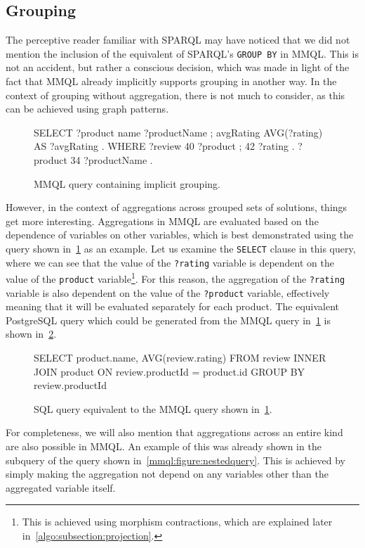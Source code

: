 \subsection{Grouping}
\label{mmql:subsection:grouping}

The perceptive reader familiar with SPARQL may have noticed that we did not mention the inclusion of the equivalent of SPARQL's \texttt{GROUP BY} in MMQL.
This is not an accident, but rather a conscious decision, which was made in light of the fact that MMQL already implicitly supports grouping in another way.
In the context of grouping without aggregation, there is not much to consider, as this can be achieved using graph patterns.

\begin{figure}[ht]
\begin{code}
SELECT {
    ?product name ?productName ;
        avgRating AVG(?rating) AS ?avgRating .
}
WHERE {
    ?review 40 ?product ;
        42 ?rating .
    ?product 34 ?productName .
}
\end{code}
\caption{MMQL query containing implicit grouping.}\label{mmql:figure:groupingmmql}
\end{figure}

However, in the context of aggregations across grouped sets of solutions, things get more interesting.
Aggregations in MMQL are evaluated based on the dependence of variables on other variables, which is best demonstrated using the query shown in~\cref{mmql:figure:groupingmmql} as an example.
Let us examine the \texttt{SELECT} clause in this query, where we can see that the value of the \texttt{?rating} variable is dependent on the value of the \texttt{product} variable\footnote{This is achieved using morphism contractions, which are explained later in~\cref{algo:subsection:projection}.}.
For this reason, the aggregation of the \texttt{?rating} variable is also dependent on the value of the \texttt{?product} variable, effectively meaning that it will be evaluated separately for each product.
The equivalent PostgreSQL query which could be generated from the MMQL query in~\cref{mmql:figure:groupingmmql} is shown in~\cref{mmql:figure:groupingsql}.

\begin{figure}[ht]
\begin{code}
SELECT product.name, AVG(review.rating)
FROM review INNER JOIN product ON review.productId = product.id
GROUP BY review.productId
\end{code}
\caption{SQL query equivalent to the MMQL query shown in~\cref{mmql:figure:groupingmmql}.}\label{mmql:figure:groupingsql}
\end{figure}

For completeness, we will also mention that aggregations across an entire kind are also possible in MMQL. An example of this was already shown in the subquery of the query shown in~\cref{mmql:figure:nestedquery}.
This is achieved by simply making the aggregation not depend on any variables other than the aggregated variable itself.

